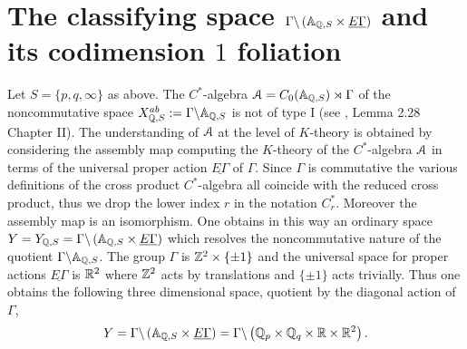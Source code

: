 

\section{The classifying space $\Gamma\backslash\left({\mathbb A}_{{\mathbb Q},S}\times\underline{E \Gamma}\right)$ and its codimension $1$ foliation} \label{sect4}

  Let $S=\{ p, q,\infty \}$ as above. The $C^*$-algebra $\mathcal{A}=C_0({\mathbb A}_{{\mathbb Q},S})\rtimes \Gamma$ of the noncommutative space $X_{{\mathbb Q},S}^{ab}:=\Gamma\backslash{\mathbb A}_{{\mathbb Q},S}$ is not of type I (see \cite{CMbook}, Lemma 2.28 Chapter II).  The  understanding of $\mathcal{A}$ at the level of $K$-theory is obtained by considering the assembly map \cite{BC} computing the $K$-theory of the  $C^*$-algebra $\mathcal{A}$ in terms of  the universal  proper action  $\underline{E \Gamma}$ of $\Gamma$. Since  $\Gamma$ is commutative the various definitions of the cross product $C^*$-algebra all coincide with the reduced cross product, thus we drop the lower index $r$ in the notation $C^*_r$. Moreover the assembly map is an isomorphism. One obtains in this way  an ordinary space $Y=Y_{{\mathbb Q},S}=\Gamma\backslash\left({\mathbb A}_{{\mathbb Q},S}\times\underline{E \Gamma}\right)$ which resolves the noncommutative nature of the quotient $\Gamma\backslash{\mathbb A}_{{\mathbb Q},S}$. The group $\Gamma$ is $\mathbb{Z}^2\times\{ \pm 1\}$ and the universal  space for proper actions $\underline{E \Gamma}$ is $\mathbb{R}^2$ where $\mathbb{Z}^2$ acts by translations and $\{ \pm 1\}$ acts trivially. Thus one obtains  the following three dimensional space, quotient by the diagonal action of $\Gamma$,
 \begin{equation}\label{3space}
 Y=\Gamma\backslash\left({\mathbb A}_{{\mathbb Q},S}\times \underline{E \Gamma}\right) =\Gamma\backslash\left({\mathbb Q}_p\times {\mathbb Q}_q\times \mathbb{R} \times \mathbb{R}^2\right).
 \end{equation}
 \vspace{.1in}
 
